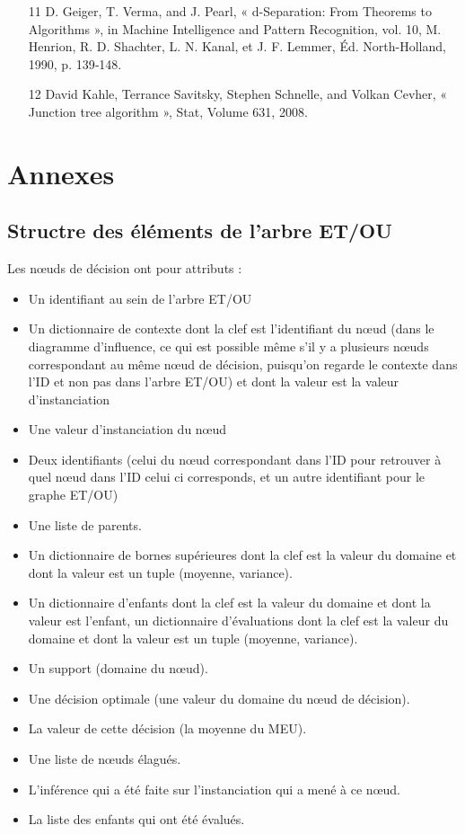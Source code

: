 \documentclass[12pt]{article}
\begin{document}
\begin{itemize}
\item[11] D. Geiger, T. Verma, and J. Pearl, « d-Separation: From Theorems to Algorithms », in Machine Intelligence and Pattern Recognition, vol. 10, M. Henrion, R. D. Shachter, L. N. Kanal, et J. F. Lemmer, Éd. North-Holland, 1990, p. 139‐148.

\item[12]David Kahle, Terrance Savitsky, Stephen Schnelle, and Volkan Cevher, « Junction tree algorithm », Stat, Volume 631, 2008.
\end{itemize}

\newpage


\section{Annexes}
\subsection{Structre des éléments de l'arbre ET/OU}
Les nœuds de décision ont pour attributs :
\begin{itemize}
\item Un identifiant au sein de l'arbre ET/OU
\item Un dictionnaire de contexte dont la clef est l'identifiant du nœud (dans le diagramme d'influence, ce qui est possible même s'il y a plusieurs nœuds correspondant au même nœud de décision, puisqu'on regarde le contexte dans l'ID et non pas dans l'arbre ET/OU) et dont la valeur est la valeur d'instanciation
\item Une valeur d'instanciation du nœud
\item Deux identifiants (celui du nœud correspondant dans l'ID pour retrouver à quel nœud dans l'ID celui ci corresponds, et un autre identifiant pour le graphe ET/OU)
\item Une liste de parents.
\item Un dictionnaire de bornes supérieures dont la clef est la valeur du domaine et dont la valeur est un tuple (moyenne, variance).
\item Un dictionnaire d'enfants dont la clef est la valeur du domaine et dont la valeur est l'enfant, un dictionnaire d'évaluations dont la clef est la valeur du domaine et dont la valeur est un tuple (moyenne, variance).
\item Un support (domaine du nœud).
\item Une décision optimale (une valeur du domaine du nœud de décision).
\item La valeur de cette décision (la moyenne du MEU).
\item Une liste de nœuds élagués.
\item L'inférence qui a été faite sur l'instanciation qui a mené à ce nœud.
\item La liste des enfants qui ont été évalués.
\end{itemize}
\end{document}
